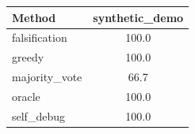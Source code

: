 \begin{tabular}{lc}
\toprule
Method & synthetic_demo \\
\midrule
falsification & 100.0 \\
greedy & 100.0 \\
majority_vote & 66.7 \\
oracle & 100.0 \\
self_debug & 100.0 \\
\bottomrule
\end{tabular}
